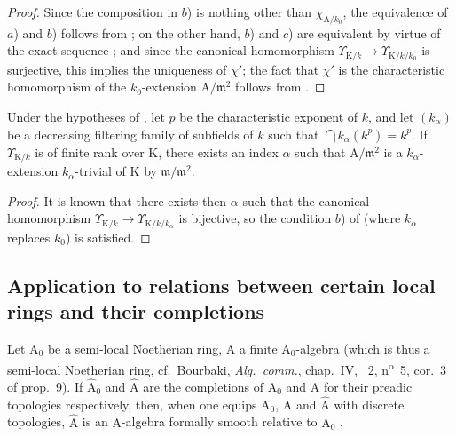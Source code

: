 \begin{proof}
Since the composition in $b$) is nothing other than $\chi_{\mathrm{A}/k_0}$, the equivalence of $a$) and $b$) follows from ; on the other hand, $b$) and $c$) are equivalent by virtue of the exact sequence ; and since the canonical homomorphism $\Upsilon_{\mathrm{K}/k}\to\Upsilon_{\mathrm{K}/k/k_0}$ is surjective, this implies the uniqueness of $\chi'$; the fact that $\chi'$ is the characteristic homomorphism of the $k_0$-extension $\mathrm{A}/\mathfrak{m}^2$ follows from .
\end{proof}

\begin{corollary}[22.2.11]
\label{0.22.2.11}
Under the hypotheses of , let $p$ be the characteristic exponent of $k$, and let $(k_\alpha)$ be a decreasing filtering family of subfields of $k$ such that $\bigcap k_\alpha(k^p)=k^p$.
If $\Upsilon_{\mathrm{K}/k}$ is of finite rank over $\mathrm{K}$, there exists an index $\alpha$ such that $\mathrm{A}/\mathfrak{m}^2$ is a $k_\alpha$-extension $k_\alpha$-trivial of $\mathrm{K}$ by $\mathfrak{m}/\mathfrak{m}^2$.
\end{corollary}

\begin{proof}
It is known  that there exists then $\alpha$ such that the canonical homomorphism $\Upsilon_{\mathrm{K}/k}\to\Upsilon_{\mathrm{K}/k/k_\alpha}$ is bijective, so the condition $b$) of  (where $k_\alpha$ replaces $k_0$) is satisfied.
\end{proof}

\subsection{Application to relations between certain local rings and their completions}
\label{subsection:0.22.3}

\begin{lemma}[22.3.1]
\label{0.22.3.1}
Let $\mathrm{A}_0$ be a semi-local Noetherian ring, $\mathrm{A}$ a finite $\mathrm{A}_0$-algebra (which is thus a semi-local Noetherian ring, cf.~Bourbaki, \emph{Alg.~comm.}, chap.~IV, \textsection~2, n\textsuperscript{o}~5, cor.~3 of prop.~9).
If $\widehat{\mathrm{A}}_0$ and $\widehat{\mathrm{A}}$ are the completions of $\mathrm{A}_0$ and $\mathrm{A}$ for their preadic topologies respectively, then, when one equips $\mathrm{A}_0$, $\mathrm{A}$ and $\widehat{\mathrm{A}}$ with discrete topologies, $\widehat{\mathrm{A}}$ is an $\mathrm{A}$-algebra formally smooth relative to $\mathrm{A}_0$ .
\end{lemma}

